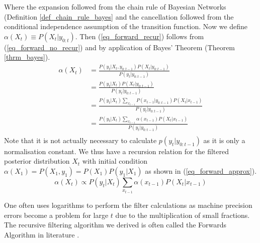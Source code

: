 Where the expansion followed from the chain rule of Bayesian Networks (Definition \ref{def_chain_rule_bayes} and the cancellation followed from the conditional independence assumption of the transition function. Now we define $\alpha(X_t) \equiv P(X_t | y_{0:t})$. Then (\ref{eq_forward_recur}) follows from (\ref{eq_forward_no_recur}) and by application of Bayes' Theorem (Theorem \ref{thrm_bayes}).
\begin{equation}
\begin{aligned}
\alpha(X_t) &= \frac{P(y_t|X_t, y_{0:t-1})P(X_t|y_{0:t-1})}{P(y_t|y_{0:t-1})} \\
& = \frac{P(y_t|X_t)P(X_t|y_{0:t-1})}{P(y_t|y_{0:t-1})} \\
& = \frac{P(y_t|X_t) \sum_{x_{t-1}} P(x_{t-1}|y_{0:t-1})P(X_t|x_{t-1})}{P(y_t|y_{0:t-1})} \\
& = \frac{P(y_t|X_t) \sum_{x_{t-1}} \alpha(x_{t-1})P(X_t|x_{t-1})}{P(y_t|y_{0:t-1})} \\
\end{aligned}
\label{eq_forward_recur}
\end{equation}
Note that it is not actually necessary to calculate $p(y_t|y_{0:t-1})$ as it is only a normalisation constant. We thus have a recursion relation for the filtered posterior distribution $X_t$ with initial condition $\alpha(X_1) = P(X_1, y_1) = P(X_1)P(y_1|X_1)$ as shown in (\ref{eq_forward_approx}).
\begin{equation}
\alpha(X_t) \propto P(y_t|X_t) \sum_{x_{t-1}} \alpha(x_{t-1})P(X_t|x_{t-1})
\label{eq_forward_approx}
\end{equation}

One often uses logarithms to perform the filter calculations as machine precision errors become a problem for large $t$ due to the multiplication of small fractions. The recursive filtering algorithm we derived is often called the Forwards Algorithm in literature \cite{barber}.

